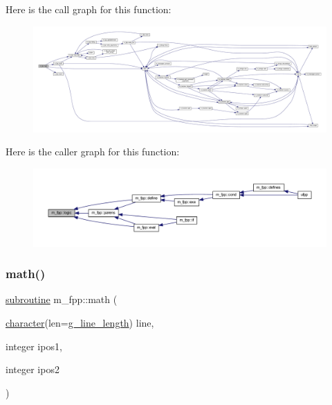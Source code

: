 Here is the call graph for this function\+:
\nopagebreak
\begin{figure}[H]
\begin{center}
\leavevmode
\includegraphics[width=350pt]{namespacem__fpp_ae036546bab009c772421d3f4e34ca93c_cgraph}
\end{center}
\end{figure}
Here is the caller graph for this function\+:
\nopagebreak
\begin{figure}[H]
\begin{center}
\leavevmode
\includegraphics[width=350pt]{namespacem__fpp_ae036546bab009c772421d3f4e34ca93c_icgraph}
\end{center}
\end{figure}
\mbox{\label{namespacem__fpp_a7fe1c908c17895ebaa5afc2dc4cd1f1f}} 
\subsubsection{\texorpdfstring{math()}{math()}}
{\footnotesize\ttfamily \hyperlink{M__stopwatch_83_8txt_acfbcff50169d691ff02d4a123ed70482}{subroutine} m\+\_\+fpp\+::math (\begin{DoxyParamCaption}\item[{\hyperlink{option__stopwatch_83_8txt_abd4b21fbbd175834027b5224bfe97e66}{character}(len=\hyperlink{namespacem__fpp_ab93f8756cf248cf8db932573009d4664}{g\+\_\+line\+\_\+length})}]{line,  }\item[{integer}]{ipos1,  }\item[{integer}]{ipos2 }\end{DoxyParamCaption})}



